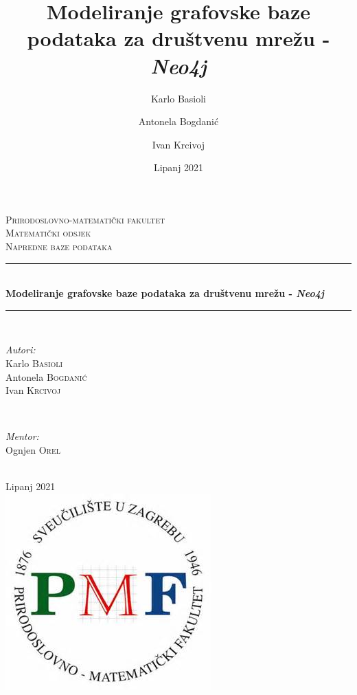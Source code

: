 \documentclass[titlepage, 12pt]{scrartcl}
\title{Modeliranje grafovske baze podataka za društvenu mrežu - \emph{Neo4j}}
\author{Karlo Basioli \and 
        Antonela Bogdanić \and 
        Ivan Krcivoj }
\date{Lipanj 2021}
\begin{document}
\begin{titlepage}

\newcommand{\HRule}{\rule{\linewidth}{0.5mm}}
\center
\textsc{\Large Prirodoslovno-matematički fakultet}\\[1.5cm] %
\textsc{\large Matematički odsjek}\\[0.5cm] %
\textsc{\large Napredne baze podataka}\\[0.5cm] 

\HRule \\[0.4cm]
{ \Large \bfseries Modeliranje grafovske baze podataka za društvenu mrežu - \emph{Neo4j}}\\[0.4cm] 
\HRule \\[1.5cm]
 

\begin{minipage}{0.4\textwidth}
\begin{flushleft} \large
\emph{Autori:}\\
Karlo \textsc{Basioli} \\
Antonela \textsc{Bogdanić} \\
Ivan \textsc{Krcivoj}
\end{flushleft}
\end{minipage}
~
\begin{minipage}{0.4\textwidth}
\begin{flushright} \large
\emph{Mentor:} \\
Ognjen \textsc{Orel} %
\end{flushright}
\end{minipage}\\[2cm]

{\large Lipanj 2021}\\[2cm] 

\includegraphics[scale=0.8]{slike/pmf_logo.jpg}\\

\vfill 

\end{titlepage}
\end{document}
